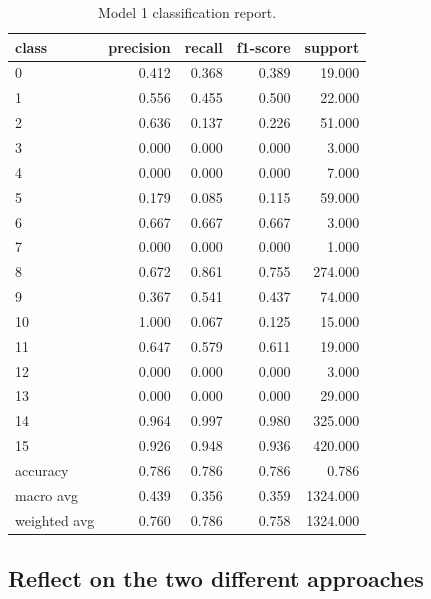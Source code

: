 \documentclass[twocolumn]{article}
\begin{document}
\begin{table}
    \centering
    \caption{Model 1 classification report.}
    \label{tab:model1-class-report}
    \begin{tabular}{lrrrr}
    \toprule
    class &  precision &  recall &  f1-score &   support \\
    \midrule
    0            &      0.412 &   0.368 &     0.389 &    19.000 \\
    1            &      0.556 &   0.455 &     0.500 &    22.000 \\
    2            &      0.636 &   0.137 &     0.226 &    51.000 \\
    3            &      0.000 &   0.000 &     0.000 &     3.000 \\
    4            &      0.000 &   0.000 &     0.000 &     7.000 \\
    5            &      0.179 &   0.085 &     0.115 &    59.000 \\
    6            &      0.667 &   0.667 &     0.667 &     3.000 \\
    7            &      0.000 &   0.000 &     0.000 &     1.000 \\
    8            &      0.672 &   0.861 &     0.755 &   274.000 \\
    9            &      0.367 &   0.541 &     0.437 &    74.000 \\
    10           &      1.000 &   0.067 &     0.125 &    15.000 \\
    11           &      0.647 &   0.579 &     0.611 &    19.000 \\
    12           &      0.000 &   0.000 &     0.000 &     3.000 \\
    13           &      0.000 &   0.000 &     0.000 &    29.000 \\
    14           &      0.964 &   0.997 &     0.980 &   325.000 \\
    15           &      0.926 &   0.948 &     0.936 &   420.000 \\
    accuracy     &      0.786 &   0.786 &     0.786 &     0.786 \\
    macro avg    &      0.439 &   0.356 &     0.359 &  1324.000 \\
    weighted avg &      0.760 &   0.786 &     0.758 &  1324.000 \\
    \bottomrule
    \end{tabular}
\end{table}


\subsection{Reflect on the two different approaches}
\end{document}
